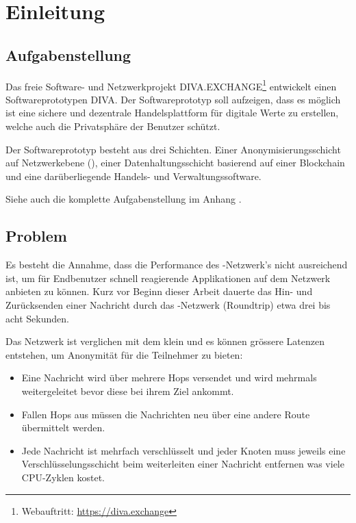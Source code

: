 \chapter{Einleitung}
\label{ch:Einleitung}




\section{Aufgabenstellung}

Das freie Software- und Netzwerkprojekt DIVA.EXCHANGE\footnote{Webauftritt: \url{https://diva.exchange}} entwickelt einen Softwareprototypen DIVA.
Der Softwareprototyp soll aufzeigen, dass es möglich ist eine sichere und dezentrale Handelsplattform für digitale Werte zu erstellen, welche auch die Privatsphäre der Benutzer schützt.

Der Softwareprototyp besteht aus drei Schichten.
Einer Anonymisierungsschicht auf Netzwerkebene (), einer Datenhaltungsschicht basierend auf einer Blockchain und eine darüberliegende Handels- und Verwaltungssoftware.

Siehe auch die komplette Aufgabenstellung im Anhang .

\section{Problem}

Es besteht die Annahme, dass die Performance des -Netzwerk's nicht ausreichend ist, um für Endbenutzer schnell reagierende Applikationen auf dem Netzwerk anbieten zu können.
Kurz vor Beginn dieser Arbeit dauerte das Hin- und Zurücksenden einer Nachricht durch das -Netzwerk (Roundtrip) etwa drei bis acht Sekunden.

Das Netzwerk ist verglichen mit dem  klein und es können grössere Latenzen entstehen, um Anonymität für die Teilnehmer zu bieten:

\begin{itemize}
    \item Eine Nachricht wird über mehrere Hops versendet und wird mehrmals weitergeleitet bevor diese bei ihrem Ziel ankommt.
    \item Fallen Hops aus müssen die Nachrichten neu über eine andere Route übermittelt werden.
    \item Jede Nachricht ist mehrfach verschlüsselt und jeder Knoten muss jeweils eine Verschlüsselungsschicht beim weiterleiten einer Nachricht entfernen was viele CPU-Zyklen kostet.
\end{itemize}



